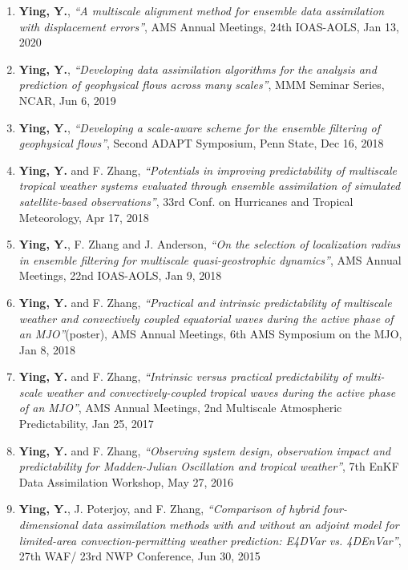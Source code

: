 \begin{enumerate}
\item \textbf{Ying, Y.},
\textit{``A multiscale alignment method for ensemble data assimilation with displacement errors''},
AMS Annual Meetings, 24th IOAS-AOLS, Jan 13, 2020

\item \textbf{Ying, Y.},
\textit{``Developing data assimilation algorithms for the analysis and prediction of geophysical flows across many scales''},
MMM Seminar Series, NCAR, Jun 6, 2019

\item \textbf{Ying, Y.},
\textit{``Developing a scale-aware scheme for the ensemble filtering of geophysical flows''},
Second ADAPT Symposium, Penn State, Dec 16, 2018

\item \textbf{Ying, Y.} and F. Zhang,
\textit{``Potentials in improving predictability of multiscale tropical weather systems evaluated through ensemble assimilation of simulated satellite-based observations''},
33rd Conf. on Hurricanes and Tropical Meteorology, Apr 17, 2018

\item \textbf{Ying, Y.}, F. Zhang and J. Anderson,
\textit{``On the selection of localization radius in ensemble filtering for multiscale quasi-geostrophic dynamics''},
AMS Annual Meetings, 22nd IOAS-AOLS, Jan 9, 2018

\item \textbf{Ying, Y.} and F. Zhang,
\textit{``Practical and intrinsic predictability of multiscale weather and convectively coupled equatorial waves during the active phase of an MJO''}(poster),
AMS Annual Meetings, 6th AMS Symposium on the MJO, Jan 8, 2018

\item \textbf{Ying, Y.} and F. Zhang,
\textit{``Intrinsic versus practical predictability of multi-scale weather and convectively-coupled tropical waves during the active phase of an MJO''},
AMS Annual Meetings, 2nd Multiscale Atmospheric Predictability, Jan 25, 2017

\item \textbf{Ying, Y.} and F. Zhang,
\textit{``Observing system design, observation impact and predictability for Madden-Julian Oscillation and tropical weather''},
7th EnKF Data Assimilation Workshop, May 27, 2016

\item \textbf{Ying, Y.}, J. Poterjoy, and F. Zhang,
\textit{``Comparison of hybrid four-dimensional data assimilation methods with and without an adjoint model for limited-area convection-permitting weather prediction: E4DVar vs. 4DEnVar''},
27th WAF/ 23rd NWP Conference, Jun 30, 2015


\end{enumerate}
